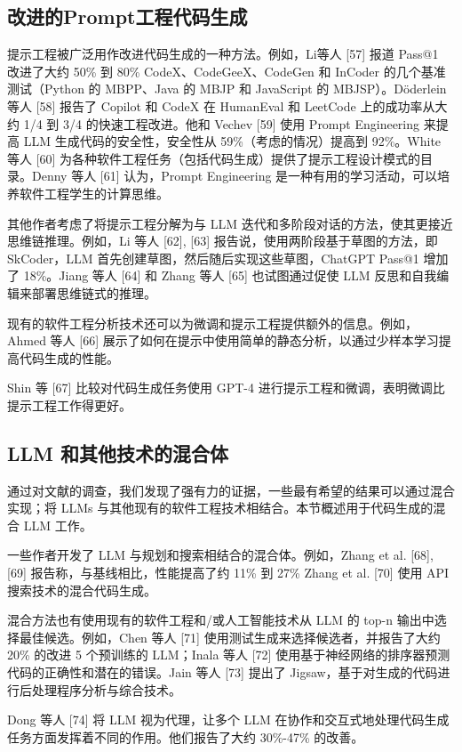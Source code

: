 \begin{translation}
\subsection{改进的Prompt工程代码生成}

提示工程被广泛用作改进代码生成的一种方法。例如，Li等人 [57] 报道 Pass@1 改进了大约 50\% 到 80\% CodeX、CodeGeeX、CodeGen 和 InCoder 的几个基准测试（Python 的 MBPP、Java 的 MBJP 和 JavaScript 的 MBJSP）。Döderlein 等人 [58] 报告了 Copilot 和 CodeX 在 HumanEval 和 LeetCode 上的成功率从大约 1/4 到 3/4 的快速工程改进。他和 Vechev [59] 使用 Prompt Engineering 来提高 LLM 生成代码的安全性，安全性从 59\%（考虑的情况）提高到 92\%。White 等人 [60] 为各种软件工程任务（包括代码生成）提供了提示工程设计模式的目录。Denny 等人 [61] 认为，Prompt Engineering 是一种有用的学习活动，可以培养软件工程学生的计算思维。

其他作者考虑了将提示工程分解为与 LLM 迭代和多阶段对话的方法，使其更接近思维链推理。例如，Li 等人 [62], [63] 报告说，使用两阶段基于草图的方法，即 SkCoder，LLM 首先创建草图，然后随后实现这些草图，ChatGPT Pass@1 增加了 18\%。Jiang 等人 [64] 和 Zhang 等人 [65] 也试图通过促使 LLM 反思和自我编辑来部署思维链式的推理。

现有的软件工程分析技术还可以为微调和提示工程提供额外的信息。例如，Ahmed 等人 [66] 展示了如何在提示中使用简单的静态分析，以通过少样本学习提高代码生成的性能。

Shin 等 [67] 比较对代码生成任务使用 GPT-4 进行提示工程和微调，表明微调比提示工程工作得更好。

\subsection{LLM 和其他技术的混合体}

通过对文献的调查，我们发现了强有力的证据，一些最有希望的结果可以通过混合实现；将 LLMs 与其他现有的软件工程技术相结合。本节概述用于代码生成的混合 LLM 工作。

一些作者开发了 LLM 与规划和搜索相结合的混合体。例如，Zhang et al. [68], [69] 报告称，与基线相比，性能提高了约 11\% 到 27\% Zhang et al. [70] 使用 API 搜索技术的混合代码生成。

混合方法也有使用现有的软件工程和/或人工智能技术从 LLM 的 top-n 输出中选择最佳候选。例如，Chen 等人 [71] 使用测试生成来选择候选者，并报告了大约 20\% 的改进 5 个预训练的 LLM；Inala 等人 [72] 使用基于神经网络的排序器预测代码的正确性和潜在的错误。Jain 等人 [73] 提出了 Jigsaw，基于对生成的代码进行后处理程序分析与综合技术。

Dong 等人 [74] 将 LLM 视为代理，让多个 LLM 在协作和交互式地处理代码生成任务方面发挥着不同的作用。他们报告了大约 30\%-47\% 的改善。


\end{translation}
